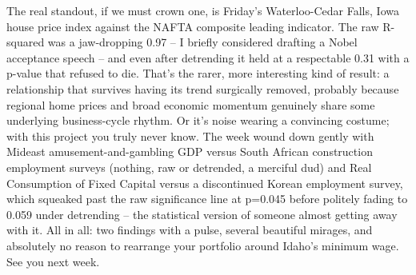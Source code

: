 The real standout, if we must crown one, is Friday's Waterloo-Cedar Falls, Iowa house price index against the NAFTA composite leading indicator. The raw R-squared was a jaw-dropping 0.97 -- I briefly considered drafting a Nobel acceptance speech -- and even after detrending it held at a respectable 0.31 with a p-value that refused to die. That's the rarer, more interesting kind of result: a relationship that survives having its trend surgically removed, probably because regional home prices and broad economic momentum genuinely share some underlying business-cycle rhythm. Or it's noise wearing a convincing costume; with this project you truly never know. The week wound down gently with Mideast amusement-and-gambling GDP versus South African construction employment surveys (nothing, raw or detrended, a merciful dud) and Real Consumption of Fixed Capital versus a discontinued Korean employment survey, which squeaked past the raw significance line at p=0.045 before politely fading to 0.059 under detrending -- the statistical version of someone almost getting away with it. All in all: two findings with a pulse, several beautiful mirages, and absolutely no reason to rearrange your portfolio around Idaho's minimum wage. See you next week.
